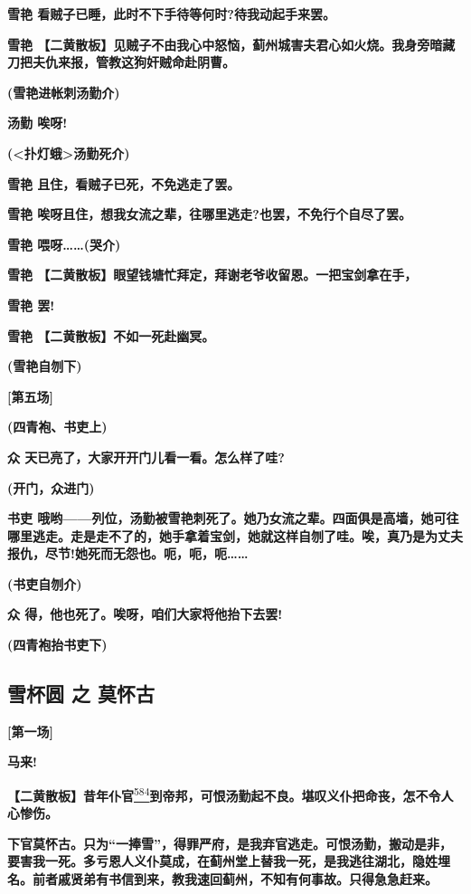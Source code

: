 \textbf{雪艳 看贼子已睡，此时不下手待等何时?待我动起手来罢。}

\textbf{雪艳
【二黄散板】见贼子不由我心中怒恼，蓟州城害夫君心如火烧。我身旁暗藏刀把夫仇来报，管教这狗奸贼命赴阴曹。}

\textbf{(雪艳进帐刺汤勤介)}

\textbf{汤勤 唉呀!}

\textbf{(\textless{}扑灯蛾\textgreater{}汤勤死介)}

\textbf{雪艳 且住，看贼子已死，不免逃走了罢。}

\textbf{雪艳
唉呀且住，想我女流之辈，往哪里逃走?也罢，不免行个自尽了罢。}

\textbf{雪艳 喂呀\ldots{}\ldots{}(哭介)}

\textbf{雪艳
【二黄散板】眼望钱塘忙拜定，拜谢老爷收留恩。一把宝剑拿在手，}

\textbf{雪艳 罢!}

\textbf{雪艳 【二黄散板】不如一死赴幽冥。}

\textbf{(雪艳自刎下)}

\textbf{{[}第五场{]}}

\textbf{(四青袍、书吏上)}

\textbf{众 天已亮了，大家开开门儿看一看。怎么样了哇?}

\textbf{(开门，众进门)}

\textbf{书吏
哦哟------列位，汤勤被雪艳刺死了。她乃女流之辈。四面俱是高墙，她可往哪里逃走。走是走不了的，她手拿着宝剑，她就这样自刎了哇。唉，真乃是为丈夫报仇，尽节!她死而无怨也。呃，呃，呃\ldots{}\ldots{}}

\textbf{(书吏自刎介)}

\textbf{众 得，他也死了。唉呀，咱们大家将他抬下去罢!}

\textbf{(四青袍抬书吏下)}

\newpage
\hypertarget{ux96eaux676fux5706-ux4e4b-ux83abux6000ux53e4}{%
\subsection{雪杯圆 之
莫怀古}\label{ux96eaux676fux5706-ux4e4b-ux83abux6000ux53e4}}

\textbf{{[}第一场{]}}

\textbf{马来!}

\textbf{【二黄散板】昔年仆官}\protect\hyperlink{fn584}{\textsuperscript{584}}\textbf{到帝邦，可恨汤勤起不良。堪叹义仆把命丧，怎不令人心惨伤。}

\textbf{下官莫怀古。只为``一捧雪''，得罪严府，是我弃官逃走。可恨汤勤，搬动是非，要害我一死。多亏恩人义仆莫成，在蓟州堂上替我一死，是我逃往湖北，隐姓埋名。前者戚贤弟有书信到来，教我速回蓟州，不知有何事故。只得急急赶来。}

